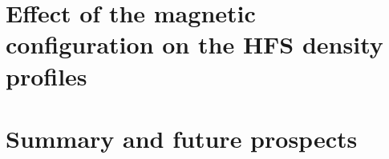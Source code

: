 \documentclass[10pt,a4paper,twoside]{report}
\begin{document}
\chapter{Effect of the magnetic configuration on the HFS density profiles}
\label{chapter:magconf}

\cleardoublepage

\chapter{Summary and future prospects}
\label{chapter:summaryandconclusions}

\cleardoublepage



{}


%
%
%
%
%
%
%
%
%
%
\end{document}

